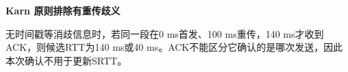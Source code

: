 {\color{ink}\bfseries Karn 原则排除有重传歧义}\par\vspace{1bp}无时间戳等消歧信息时，若同一段在0 ms首发、100 ms重传，140 ms才收到ACK，则候选RTT为140 ms或40 ms。ACK不能区分它确认的是哪次发送，因此本次确认不用于更新SRTT。
